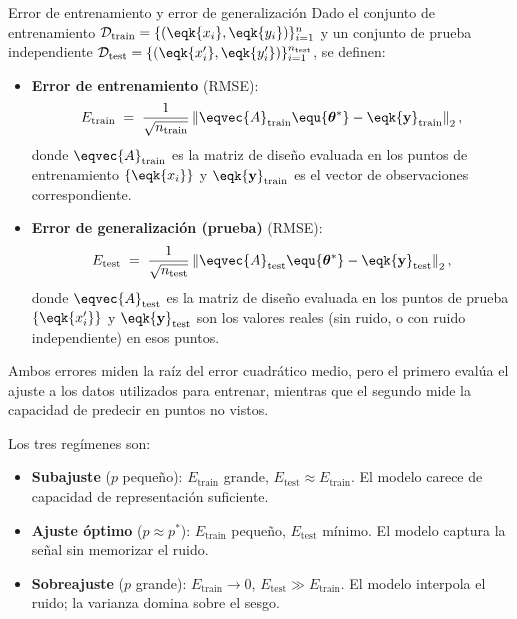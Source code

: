 \begin{definicion}{Error de entrenamiento y error de generalización}
\label{def:train_test_error}
Dado el conjunto de entrenamiento $\mathcal{D}_{\mathrm{train}} = \{(\eqk{x_i}, \eqk{y_i})\}_{i=1}^n$ y un conjunto de prueba independiente $\mathcal{D}_{\mathrm{test}} = \{(\eqk{x_i'}, \eqk{y_i'})\}_{i=1}^{n_{\mathrm{test}}}$, se definen:

\begin{itemize}
  \item \textbf{Error de entrenamiento} (RMSE):
  \[
    E_{\mathrm{train}} \;=\;
    \frac{1}{\sqrt{n_{\mathrm{train}}}}\left\|
      \eqvec{A}_{\mathrm{train}} \equ{\boldsymbol{\theta}^*} - \eqk{\mathbf{y}}_{\mathrm{train}}
    \right\|_2,
  \]
  donde $\eqvec{A}_{\mathrm{train}}$ es la matriz de diseño evaluada en los
  puntos de entrenamiento $\{\eqk{x_i}\}$ y $\eqk{\mathbf{y}}_{\mathrm{train}}$ es el
  vector de observaciones correspondiente.

  \item \textbf{Error de generalización (prueba)} (RMSE):
  \[
    E_{\mathrm{test}} \;=\;
    \frac{1}{\sqrt{n_{\mathrm{test}}}}\left\|
      \eqvec{A}_{\mathrm{test}} \equ{\boldsymbol{\theta}^*} - \eqk{\mathbf{y}}_{\mathrm{test}}
    \right\|_2,
  \]
  donde $\eqvec{A}_{\mathrm{test}}$ es la matriz de diseño evaluada en los
  puntos de prueba $\{\eqk{x_i'}\}$ y $\eqk{\mathbf{y}}_{\mathrm{test}}$ son los
  valores reales (sin ruido, o con ruido independiente) en esos puntos.
\end{itemize}

Ambos errores miden la raíz del error cuadrático medio, pero el primero
evalúa el ajuste a los datos utilizados para entrenar, mientras que el
segundo mide la capacidad de predecir en puntos no vistos.
\end{definicion}

Los tres regímenes son:

\begin{itemize}[nosep, leftmargin=1.5em]
  \item \textbf{Subajuste} ($p$ pequeño): $E_{\mathrm{train}}$ grande,
    $E_{\mathrm{test}} \approx E_{\mathrm{train}}$. El modelo carece de
    capacidad de representación suficiente.
  \item \textbf{Ajuste óptimo} ($p \approx p^*$): $E_{\mathrm{train}}$
    pequeño, $E_{\mathrm{test}}$ mínimo. El modelo captura la señal sin
    memorizar el ruido.
  \item \textbf{Sobreajuste} ($p$ grande): $E_{\mathrm{train}} \to 0$,
    $E_{\mathrm{test}} \gg E_{\mathrm{train}}$. El modelo interpola el
    ruido; la varianza domina sobre el sesgo.
\end{itemize}

